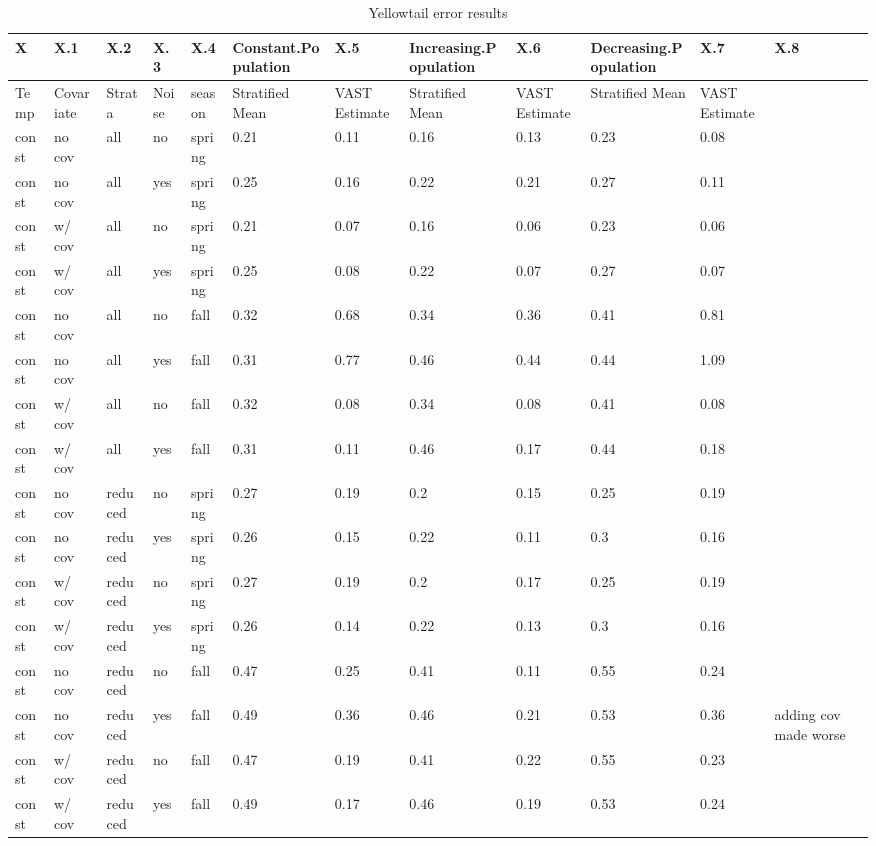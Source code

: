 \documentclass[
  12pt,
]{article}
\begin{document}
\begin{table}

\caption{\label{tab:unnamed-chunk-1}Yellowtail error results}
\centering
\begin{tabular}[t]{l|l|l|l|l|l|l|l|l|l|l|l}
\hline
X & X.1 & X.2 & X.3 & X.4 & Constant.Population & X.5 & Increasing.Population & X.6 & Decreasing.Population & X.7 & X.8\\
\hline
Temp & Covariate & Strata & Noise & season & Stratified Mean & VAST Estimate & Stratified Mean & VAST Estimate & Stratified Mean & VAST Estimate & \\
\hline
const & no cov & all & no & spring & 0.21 & 0.11 & 0.16 & 0.13 & 0.23 & 0.08 & \\
\hline
const & no cov & all & yes & spring & 0.25 & 0.16 & 0.22 & 0.21 & 0.27 & 0.11 & \\
\hline
const & w/ cov & all & no & spring & 0.21 & 0.07 & 0.16 & 0.06 & 0.23 & 0.06 & \\
\hline
const & w/ cov & all & yes & spring & 0.25 & 0.08 & 0.22 & 0.07 & 0.27 & 0.07 & \\
\hline
const & no cov & all & no & fall & 0.32 & 0.68 & 0.34 & 0.36 & 0.41 & 0.81 & \\
\hline
const & no cov & all & yes & fall & 0.31 & 0.77 & 0.46 & 0.44 & 0.44 & 1.09 & \\
\hline
const & w/ cov & all & no & fall & 0.32 & 0.08 & 0.34 & 0.08 & 0.41 & 0.08 & \\
\hline
const & w/ cov & all & yes & fall & 0.31 & 0.11 & 0.46 & 0.17 & 0.44 & 0.18 & \\
\hline
const & no cov & reduced & no & spring & 0.27 & 0.19 & 0.2 & 0.15 & 0.25 & 0.19 & \\
\hline
const & no cov & reduced & yes & spring & 0.26 & 0.15 & 0.22 & 0.11 & 0.3 & 0.16 & \\
\hline
const & w/ cov & reduced & no & spring & 0.27 & 0.19 & 0.2 & 0.17 & 0.25 & 0.19 & \\
\hline
const & w/ cov & reduced & yes & spring & 0.26 & 0.14 & 0.22 & 0.13 & 0.3 & 0.16 & \\
\hline
const & no cov & reduced & no & fall & 0.47 & 0.25 & 0.41 & 0.11 & 0.55 & 0.24 & \\
\hline
const & no cov & reduced & yes & fall & 0.49 & 0.36 & 0.46 & 0.21 & 0.53 & 0.36 & adding cov made worse\\
\hline
const & w/ cov & reduced & no & fall & 0.47 & 0.19 & 0.41 & 0.22 & 0.55 & 0.23 & \\
\hline
const & w/ cov & reduced & yes & fall & 0.49 & 0.17 & 0.46 & 0.19 & 0.53 & 0.24 & \\

\end{tabular}
\end{table}
\end{document}
